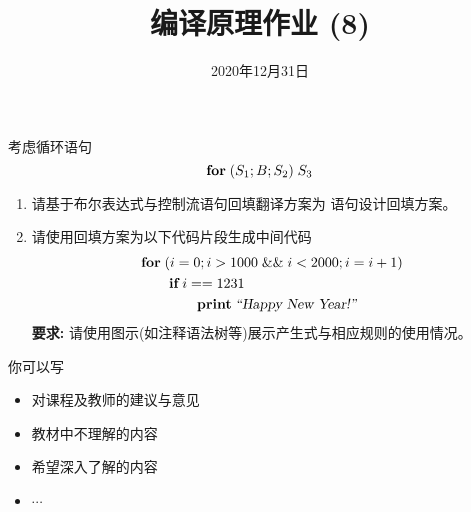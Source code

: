 \documentclass[a4paper, justified]{tufte-handout}
\title{编译原理作业 (8)}
\date{2020年12月31日}
\begin{document}
\maketitle
\noplagiarism %
\begin{abstract}
\end{abstract}
\beginrequired

\begin{problem}[\score{10 = 5 + 5}]
  考虑循环语句
  \[
    \text{\bf for} \;(S_{1}; B; S_{2})\; S_{3}
  \]
  \begin{enumerate}[(1)]
    \item 请基于布尔表达式与控制流语句回填翻译方案为 \forkw{} 语句设计回填方案。
    \item 请使用回填方案为以下代码片段生成中间代码
      \begin{align*}
        &\text{\bf for}\; (i = 0; i > 1000 \;\&\&\; i < 2000; i = i + 1) \\
          &\qquad \text{\bf if}\; i == 1231\; \\
          &\qquad\qquad \text{\bf print}\; {\textsl{``Happy New Year!''}}
      \end{align*}
      {\bf 要求:} 请使用图示(如注释语法树等)展示产生式与相应规则的使用情况。
  \end{enumerate}
\end{problem}

\begin{solution}
\end{solution}



\beginfb

你可以写
\begin{itemize}
  \item 对课程及教师的建议与意见
  \item 教材中不理解的内容
  \item 希望深入了解的内容
  \item $\cdots$
\end{itemize}
\end{document}

